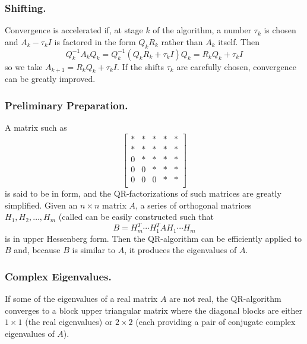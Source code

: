 \documentclass{ximera}
\begin{document}
    
\subsubsection*{Shifting.} Convergence is accelerated if, at stage $k$ of the algorithm, a number $\tau_{k}$ is chosen and $A_{k} - \tau_{k}I$ is factored in the form $Q_{k}R_{k}$ rather than $A_{k}$ itself. Then
\begin{equation*}
Q_{k}^{-1}A_{k}Q_{k} = Q_{k}^{-1}(Q_{k}R_{k} + \tau_{k}I)Q_{k} = R_{k}Q_{k} + \tau_{k}I
\end{equation*}
so we take $A_{k+1} = R_{k}Q_{k} + \tau_{k}I$. If the shifts $\tau_{k}$ are carefully chosen, convergence can be greatly improved.
    
\subsubsection*{Preliminary Preparation.} A matrix such as
\begin{equation*}
\left[ \begin{array}{rrrrr}
\ast  & \ast & \ast & \ast & \ast  \\
\ast  & \ast & \ast & \ast & \ast  \\
0  & \ast & \ast & \ast & \ast  \\
0  & 0 & \ast & \ast & \ast  \\
0  & 0 & 0 & \ast & \ast  \\
\end{array}\right]
\end{equation*}
is said to be in  form, and the QR-factorizations of such matrices are greatly simplified. Given an $n \times n$ matrix $A$, a series of orthogonal matrices $H_{1}, H_{2}, \dots, H_{m}$ (called  can be easily constructed such that
\begin{equation*}
B = H_{m}^T \cdots H_{1}^TAH_{1} \cdots H_{m}
\end{equation*}
is in upper Hessenberg form. Then the QR-algorithm can be efficiently applied to $B$ and, because $B$ is similar to $A$, it produces the eigenvalues of $A$.
    
\subsubsection*{Complex Eigenvalues.} If some of the eigenvalues of a real matrix $A$ are not real, the QR-algorithm converges to a block upper triangular matrix where the diagonal blocks are either $1 \times 1$ (the real eigenvalues) or $2 \times 2$ (each providing a pair of conjugate complex eigenvalues of $A$).
\end{document}
